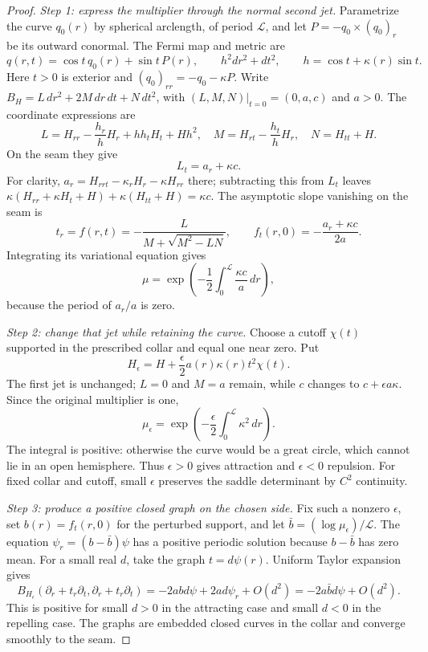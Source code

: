 \documentclass[11pt]{amsart}
\theoremstyle{definition}
\theoremstyle{remark}
\numberwithin{equation}{section}
\begin{document}
\begin{proof}
\emph{Step 1: express the multiplier through the normal second jet.}
Parametrize the curve $q_0(r)$ by spherical arclength, of period
$\mathcal L$, and let $P=-q_0\times(q_0)_r$ be its outward conormal.
The Fermi map and metric are
\[
 q(r,t)=\cos t\,q_0(r)+\sin t\,P(r),\qquad
 h^2dr^2+dt^2,\qquad h=\cos t+\kappa(r)\sin t.
\]
Here $t>0$ is exterior and $(q_0)_{rr}=-q_0-\kappa P$.
Write $B_H=L\,dr^2+2M\,dr\,dt+N\,dt^2$, with
$(L,M,N)|_{t=0}=(0,a,c)$ and $a>0$. The coordinate expressions are
\[
 L=H_{rr}-\frac{h_r}{h}H_r+hh_tH_t+Hh^2,
 \quad M=H_{rt}-\frac{h_t}{h}H_r,\quad N=H_{tt}+H.
\]
On the seam they give
\begin{equation}\label{eq:seam-derivative}
 L_t=a_r+\kappa c.
\end{equation}
For clarity, $a_r=H_{rrt}-\kappa_rH_r-\kappa H_{rr}$ there;
subtracting this from $L_t$ leaves
$\kappa(H_{rr}+\kappa H_t+H)+\kappa(H_{tt}+H)=\kappa c$.
The asymptotic slope vanishing on the seam is
\[
 t_r=f(r,t)=-\frac{L}{M+\sqrt{M^2-LN}},\qquad
 f_t(r,0)=-\frac{a_r+\kappa c}{2a}.
\]
Integrating its variational equation gives
\begin{equation}\label{eq:multiplier}
 \mu=\exp\left(-\frac12\int_0^{\mathcal L}\frac{\kappa c}{a}\,dr\right),
\end{equation}
because the period of $a_r/a$ is zero.

\emph{Step 2: change that jet while retaining the curve.}
Choose a cutoff $\chi(t)$ supported in the prescribed collar and equal
one near zero. Put
\[
 H_\epsilon=H+\frac\epsilon2a(r)\kappa(r)t^2\chi(t).
\]
The first jet is unchanged; $L=0$ and $M=a$ remain, while $c$ changes
to $c+\epsilon a\kappa$. Since the original multiplier is one,
\begin{equation}\label{eq:perturbed-multiplier}
 \mu_\epsilon=\exp\left(-\frac\epsilon2
                  \int_0^{\mathcal L}\kappa^2\,dr\right).
\end{equation}
The integral is positive: otherwise the curve would be a great circle,
which cannot lie in an open hemisphere. Thus $\epsilon>0$ gives
attraction and $\epsilon<0$ repulsion. For fixed collar and cutoff, small
$\epsilon$ preserves the saddle determinant by $C^2$ continuity.

\emph{Step 3: produce a positive closed graph on the chosen side.}
Fix such a nonzero $\epsilon$, set $b(r)=f_t(r,0)$ for the perturbed
support, and let $\bar b=(\log\mu_\epsilon)/\mathcal L$.
The equation $\psi_r=(b-\bar b)\psi$ has a positive periodic solution
because $b-\bar b$ has zero mean.
For a small real $d$, take the graph $t=d\psi(r)$. Uniform Taylor expansion gives
\[
 B_{H_\epsilon}(\partial_r+t_r\partial_t,
                       \partial_r+t_r\partial_t)
 =-2abd\psi+2ad\psi_r+O(d^2)
 =-2a\bar bd\psi+O(d^2).
\]
This is positive for small $d>0$ in the attracting case and small
$d<0$ in the repelling case. The graphs are embedded closed curves
in the collar and converge smoothly to the seam.
\end{proof}
\end{document}
